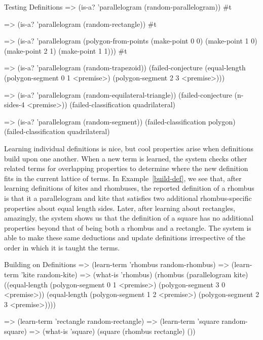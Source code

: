 \begin{repl-example}
[label=test-def]
{Testing Definitions}
=> (is-a? 'parallelogram (random-parallelogram))
#t

=> (is-a? 'parallelogram (random-rectangle))
#t

=> (is-a? 'parallelogram (polygon-from-points
                (make-point 0 0)
                (make-point 1 0)
                (make-point 2 1)
                (make-point 1 1)))
#t

=> (is-a? 'parallelogram (random-trapezoid))
(failed-conjecture
 (equal-length (polygon-segment 0 1 <premise>)
               (polygon-segment 2 3 <premise>)))

=> (is-a? 'parallelogram (random-equilateral-triangle))
(failed-conjecture (n-sides-4 <premise>))
(failed-classification quadrilateral)

=> (is-a? 'parallelogram (random-segment))
(failed-classification polygon)
(failed-classification quadrilateral)
\end{repl-example}

Learning individual definitions is nice, but cool properties arise
when definitions build upon one another. When a new term is learned,
the system checks other related terms for overlapping properties to
determine where the new definition fits in the current lattice of
terms. In Example~\ref{build-def}, we see that, after learning
definitions of kites and rhombuses, the reported definition of a
rhombus is that it a parallelogram and kite that satisfies two
additional rhombus-specific properties about equal length
sides. Later, after learning about rectangles, amazingly, the system
shows us that the definition of a square has no additional properties
beyond that of being both a rhombus and a rectangle. The system is
able to make these same deductions and update definitions irrespective
of the order in which it is taught the terms.

\begin{repl-example}
[label=build-def]
{Building on Definitions}
=> (learn-term 'rhombus random-rhombus)
=> (learn-term 'kite random-kite)
=> (what-is 'rhombus)
(rhombus
 (parallelogram kite)
 ((equal-length (polygon-segment 0 1 <premise>)
                (polygon-segment 3 0 <premise>))
  (equal-length (polygon-segment 1 2 <premise>)
                (polygon-segment 2 3 <premise>))))

=> (learn-term 'rectangle random-rectangle)
=> (learn-term 'square random-square)
=> (what-is 'square)
(square (rhombus rectangle) ())
\end{repl-example}

